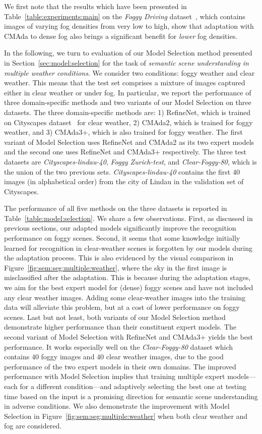 \documentclass[twocolumn]{svjour3}          \smartqed  \usepackage{graphicx}
\begin{document}
We first note that the results which have been presented in Table~\ref{table:experiments:main} on the \emph{Foggy Driving} dataset~\cite{SFSU_synthetic}, which contains images of varying fog densities from very low to high, show that adaptation with CMAda to dense fog also brings a significant benefit for \emph{lower} fog densities.

In the following, we turn to evaluation of our Model Selection method presented in Section~\ref{sec:model:selection} for the task of \emph{semantic scene understanding in multiple weather conditions}. We consider two conditions: foggy weather and clear weather. This means that the test set comprises a mixture of images captured either in clear weather or under fog. In particular, we report the performance of three domain-specific methods and two variants of our Model Selection on three datasets. The three domain-specific methods are: 1) RefineNet, which is trained on Cityscapes dataset~\cite{refinenet} for clear weather, 2) CMAda2, which is trained for foggy weather, and 3) CMAda3+, which is also trained for foggy weather. The first variant of Model Selection uses RefineNet and CMAda2 as its two expert models and the second one uses RefineNet and CMAda3+ respectively. The three test datasets are \emph{Cityscapes-lindau-40}, \emph{Foggy Zurich-test}, and \emph{Clear-Foggy-80}, which is the union of the two previous sets. \emph{Cityscapes-lindau-40} contains the first 40 images (in alphabetical order) from the city of Lindau in the validation set of Cityscapes.

The performance of all five methods on the three datasets is reported in Table~\ref{table:model:selection}. We share a few observations. First, as discussed in previous sections, our adapted models significantly improve the recognition performance on foggy scenes. Second, it seems that some knowledge initially learned for recognition in clear-weather scenes is forgotten by our models during the adaptation process.  This is also evidenced by the visual comparison in Figure~\ref{fig:sem:seg:multiple:weather}, where the sky in the first image is misclassified after the adaptation.
This is because during the adaptation stages, we aim for the best expert model for (dense) foggy scenes and have not included any clear weather images. Adding some clear-weather images into the training data will alleviate this problem, but at a cost of lower performance on foggy scenes. Last but not least, both variants of our Model Selection method demonstrate higher performance than their constituent expert models. The second variant of Model Selection with RefineNet and CMAda3+ yields the best performance. It works especially well on the \emph{Clear-Foggy-80} dataset which contains $40$ foggy images and $40$ clear weather images, due to the good performance of the two expert models in their own domains. The improved performance with Model Selection implies that training multiple expert models---each for a different condition---and adaptively selecting the best one at testing time based on the input is a promising direction for semantic scene understanding in adverse conditions. We also demonstrate the improvement with Model Selection in Figure~\ref{fig:sem:seg:multiple:weather} when both clear weather and fog are considered.
\end{document}
